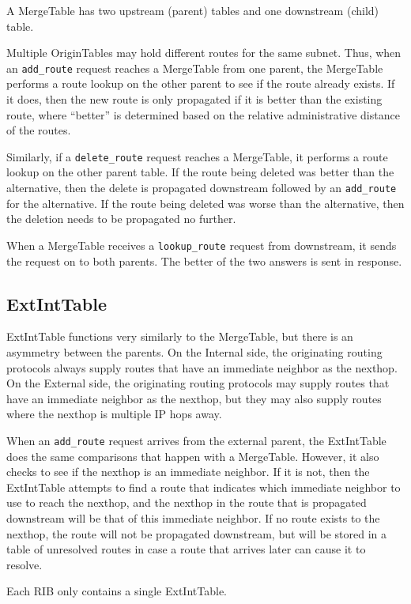 \documentclass[11pt]{article}
\begin{document}
A MergeTable has two upstream (parent) tables and one downstream
(child) table.

Multiple OriginTables may hold different routes for the same subnet.
Thus, when an {\tt add\_route} request reaches a MergeTable from one
parent, the MergeTable performs a route lookup on the other parent to
see if the route already exists.  If it does, then the new route is
only propagated if it is better than the existing route, where
``better'' is determined based on the relative administrative distance
of the routes.

Similarly, if a {\tt delete\_route} request reaches a MergeTable, it
performs a route lookup on the other parent table.  If the route being
deleted was better than the alternative, then the delete is propagated
downstream followed by an {\tt add\_route} for the alternative.  If the
route being deleted was worse than the alternative, then the deletion
needs to be propagated no further.

When a MergeTable receives a {\tt lookup\_route} request from
downstream, it sends the request on to both parents.  The better of
the two answers is sent in response.

\subsection{ExtIntTable}

ExtIntTable functions very similarly to the MergeTable, but there is
an asymmetry between the parents.  On the Internal side, the
originating routing protocols always supply routes that have an
immediate neighbor as the nexthop.  On the External side, the
originating routing protocols may supply routes that have an immediate
neighbor as the nexthop, but they may also supply routes where the
nexthop is multiple IP hops away.  

When an {\tt add\_route} request arrives from the external parent, the
ExtIntTable does the same comparisons that happen with a MergeTable.
However, it also checks to see if the nexthop is an immediate
neighbor.  If it is not, then the ExtIntTable attempts to find a route
that indicates which immediate neighbor to use to reach the nexthop,
and the nexthop in the route that is propagated downstream will be
that of this immediate neighbor.  If no route exists to the nexthop,
the route will not be propagated downstream, but will be stored in a
table of unresolved routes in case a route that arrives later can
cause it to resolve.

Each RIB only contains a single ExtIntTable.
\end{document}
